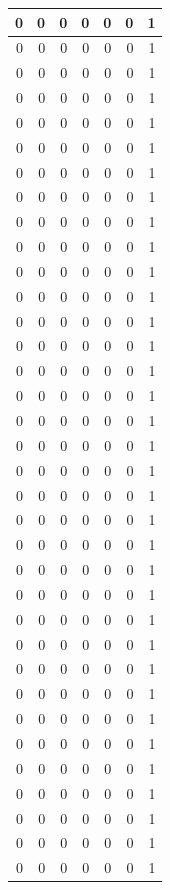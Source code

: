 \documentclass[
  12pt,
]{krantz}
\begin{document}
\begin{tabular}{r|r|r|r|r|r|r}
\hline
0 & 0 & 0 & 0 & 0 & 0 & 1\\
\hline
0 & 0 & 0 & 0 & 0 & 0 & 1\\
\hline
0 & 0 & 0 & 0 & 0 & 0 & 1\\
\hline
0 & 0 & 0 & 0 & 0 & 0 & 1\\
\hline
0 & 0 & 0 & 0 & 0 & 0 & 1\\
\hline
0 & 0 & 0 & 0 & 0 & 0 & 1\\
\hline
0 & 0 & 0 & 0 & 0 & 0 & 1\\
\hline
0 & 0 & 0 & 0 & 0 & 0 & 1\\
\hline
0 & 0 & 0 & 0 & 0 & 0 & 1\\
\hline
0 & 0 & 0 & 0 & 0 & 0 & 1\\
\hline
0 & 0 & 0 & 0 & 0 & 0 & 1\\
\hline
0 & 0 & 0 & 0 & 0 & 0 & 1\\
\hline
0 & 0 & 0 & 0 & 0 & 0 & 1\\
\hline
0 & 0 & 0 & 0 & 0 & 0 & 1\\
\hline
0 & 0 & 0 & 0 & 0 & 0 & 1\\
\hline
0 & 0 & 0 & 0 & 0 & 0 & 1\\
\hline
0 & 0 & 0 & 0 & 0 & 0 & 1\\
\hline
0 & 0 & 0 & 0 & 0 & 0 & 1\\
\hline
0 & 0 & 0 & 0 & 0 & 0 & 1\\
\hline
0 & 0 & 0 & 0 & 0 & 0 & 1\\
\hline
0 & 0 & 0 & 0 & 0 & 0 & 1\\
\hline
0 & 0 & 0 & 0 & 0 & 0 & 1\\
\hline
0 & 0 & 0 & 0 & 0 & 0 & 1\\
\hline
0 & 0 & 0 & 0 & 0 & 0 & 1\\
\hline
0 & 0 & 0 & 0 & 0 & 0 & 1\\
\hline
0 & 0 & 0 & 0 & 0 & 0 & 1\\
\hline
0 & 0 & 0 & 0 & 0 & 0 & 1\\
\hline
0 & 0 & 0 & 0 & 0 & 0 & 1\\
\hline
0 & 0 & 0 & 0 & 0 & 0 & 1\\
\hline
0 & 0 & 0 & 0 & 0 & 0 & 1\\
\hline
0 & 0 & 0 & 0 & 0 & 0 & 1\\
\hline
0 & 0 & 0 & 0 & 0 & 0 & 1\\
\hline
0 & 0 & 0 & 0 & 0 & 0 & 1\\
\hline
0 & 0 & 0 & 0 & 0 & 0 & 1\\
\hline
0 & 0 & 0 & 0 & 0 & 0 & 1\\

\end{tabular}
\end{document}
